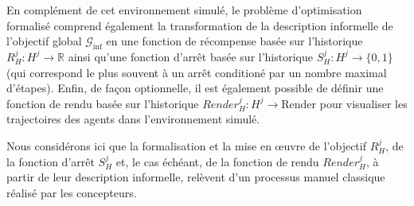 En complément de cet environnement simulé, le problème d'optimisation formalisé comprend également la transformation de la description informelle de l'objectif global $\mathcal{G}_{\text{inf}}$ en une fonction de récompense basée sur l'historique $R^j_H: H^j \rightarrow \mathbb{R}$ ainsi qu'une fonction d'arrêt basée sur l'historique $S^j_H: H^j \rightarrow \{0,1\}$ (qui correspond le plus souvent à un arrêt conditioné par un nombre maximal d'étapes). Enfin, de façon optionnelle, il est également possible de définir une fonction de rendu basée sur l'historique $Render^j_H: H^j \rightarrow \text{Render}$ pour visualiser les trajectoires des agents dans l'environnement simulé.

Nous considérons ici que la formalisation et la mise en œuvre de l'objectif $R^j_H$, de la fonction d'arrêt $S^j_H$ et, le cas échéant, de la fonction de rendu $Render^j_H$, à partir de leur description informelle, relèvent d'un processus manuel classique réalisé par les concepteurs.

